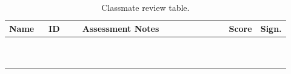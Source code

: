 \documentclass[12pt,a4paper]{article}
\begin{document}
\begin{table}[H]
\centering
\caption{Classmate review table.}
\label{tab:classmate-review}
\small
\setlength{\tabcolsep}{3pt}
\renewcommand{\arraystretch}{1.2}
\begin{tabular}{|L{0.14\linewidth}|C{0.12\linewidth}|L{0.52\linewidth}|C{0.07\linewidth}|C{0.07\linewidth}|}
\hline
\textbf{Name} & \textbf{ID} & \centering\arraybackslash\textbf{Assessment Notes} & \textbf{Score} & \textbf{Sign.}\\
\hline
\rule{0pt}{2.05cm} & & & &\\
\hline
\rule{0pt}{2.05cm} & & & &\\
\hline
\rule{0pt}{2.05cm} & & & &\\
\hline
\rule{0pt}{2.05cm} & & & &\\
\hline
\rule{0pt}{2.05cm} & & & &\\
\hline
\rule{0pt}{2.05cm} & & & &\\
\hline
\rule{0pt}{2.05cm} & & & &\\
\hline
\rule{0pt}{2.05cm} & & & &\\
\hline
\rule{0pt}{2.05cm} & & & &\\
\hline
\rule{0pt}{2.05cm} & & & &\\
\hline
\end{tabular}
\setlength{\tabcolsep}{6pt}
\renewcommand{\arraystretch}{1}
\normalsize
\end{table}
\end{document}
